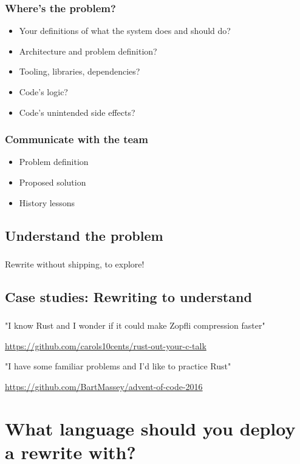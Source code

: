 \documentclass{beamer}
\begin{document}
\begin{frame}[fragile]
\frametitle{Where's the problem?}
\begin{itemize}
\item Your definitions of what the system does and should do?
\item Architecture and problem definition?
\item Tooling, libraries, dependencies?
\item Code's logic?
\item Code's unintended side effects?
\end{itemize}
\end{frame}

\begin{frame}[fragile]
\frametitle{Communicate with the team}
\begin{itemize}
\item Problem definition
\item Proposed solution
\item History lessons
\end{itemize}
\end{frame}

\subsection{Understand the problem}
\begin{frame}[fragile]
\frametitle{\insertsubsectionhead}
Rewrite without shipping, to explore!
\end{frame}

\subsection{Case studies: Rewriting to understand}

\begin{frame}[fragile]
\frametitle{\insertsubsectionhead}

"I know Rust and I wonder if it could make Zopfli compression faster"

\url{https://github.com/carols10cents/rust-out-your-c-talk}

"I have some familiar problems and I'd like to practice Rust"

\url{https://github.com/BartMassey/advent-of-code-2016}

\end{frame}

\section{What language should you deploy a rewrite with?}
\end{document}
